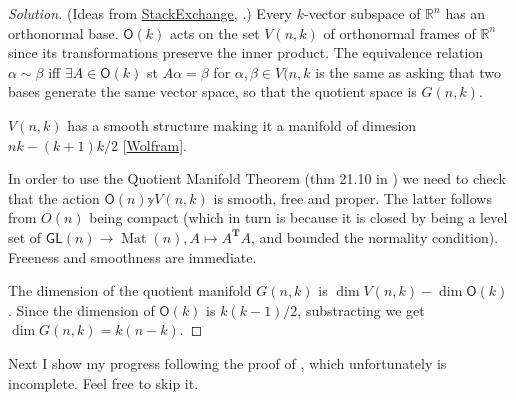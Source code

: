 \begin{proof}[Solution]\leavevmode
	(Ideas from \href{https://math.stackexchange.com/questions/1310511/looking-for-a-neat-proof-of-the-fact-that-the-grassmannian-manifold-is-hausdorff}{StackExchange}, \cite{hat}.) Every \(k\)-vector subspace of \(\mathbb{R}^n\) has an orthonormal base. \(\mathsf{O}(k)\) acts on the set \(V(n,k)\) of orthonormal frames of \(\mathbb{R}^n\) since its transformations preserve the inner product. The equivalence relation \(\alpha \sim \beta\) iff \(\exists A \in \mathsf{O}(k)\) st \(A \alpha=\beta\) for \(\alpha,\beta \in V(n,k\) is the same as asking that two bases generate the same vector space, so that the quotient space is \(G(n,k)\).


	\(V(n,k)\) has a smooth structure making it a manifold of dimesion \(nk-(k+1)k/2\) [\href{https://mathworld.wolfram.com/StiefelManifold.html}{Wolfram}].

In order to use the Quotient Manifold Theorem (thm 21.10 in \cite{lee}) we need to check that the action \(\mathsf{O}(n)\mathbb{y}V(n,k)\) is smooth, free and proper. The latter follows from \(O(n)\) being compact (which in turn is because it is closed by being a level set of \(\mathsf{GL}(n) \to \operatorname{Mat}(n),A\mapsto A^{\mathbf{T}}A\), and bounded the normality condition). Freeness and smoothness are immediate.

The dimension of the quotient manifold \(G(n,k)\) is \(\dim V(n,k)-\dim \mathsf{O}(k)\). Since the dimension of \(\mathsf{O}(k)\) is \(k(k-1)/2\), substracting we get \(\dim G(n,k)=k(n-k)\).
\end{proof}

Next I show my progress following the proof of \cite{gui2}, which unfortunately is incomplete. Feel free to skip it.

